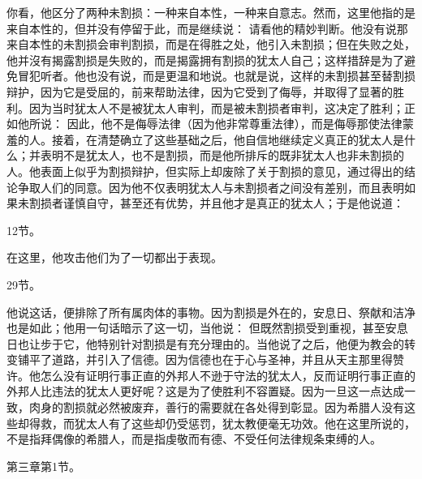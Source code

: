 你看，他区分了两种未割损：一种来自本性，一种来自意志。然而，这里他指的是来自本性的，但并没有停留于此，而是继续说： 请看他的精妙判断。他没有说那来自本性的未割损会审判割损，而是在得胜之处，他引入未割损；但在失败之处，他并沒有揭露割损是失败的，而是揭露拥有割损的犹太人自己；这样措辞是为了避免冒犯听者。他也没有说，而是更温和地说。也就是说，这样的未割损甚至替割损辩护，因为它是受屈的，前来帮助法律，因为它受到了侮辱，并取得了显著的胜利。因为当时犹太人不是被犹太人审判，而是被未割损者审判，这决定了胜利；正如他所说： 因此，他不是侮辱法律（因为他非常尊重法律），而是侮辱那使法律蒙羞的人。接着，在清楚确立了这些基础之后，他自信地继续定义真正的犹太人是什么；并表明不是犹太人，也不是割损，而是他所排斥的既非犹太人也非未割损的人。他表面上似乎为割损辩护，但实际上却废除了关于割损的意见，通过得出的结论争取人们的同意。因为他不仅表明犹太人与未割损者之间没有差别，而且表明如果未割损者谨慎自守，甚至还有优势，并且他才是真正的犹太人；于是他说道：\par

12节。\par

在这里，他攻击他们为了一切都出于表现。\par

29节。\par

他说这话，便排除了所有属肉体的事物。因为割损是外在的，安息日、祭献和洁净也是如此；他用一句话暗示了这一切，当他说： 但既然割损受到重视，甚至安息日也让步于它，他特别针对割损是有充分理由的。当他说了之后，他便为教会的转变铺平了道路，并引入了信德。因为信德也在于心与圣神，并且从天主那里得赞许。他怎么没有证明行事正直的外邦人不逊于守法的犹太人，反而证明行事正直的外邦人比违法的犹太人更好呢？这是为了使胜利不容置疑。因为一旦这一点达成一致，肉身的割损就必然被废弃，善行的需要就在各处得到彰显。因为希腊人没有这些却得救，而犹太人有了这些却仍受惩罚，犹太教便毫无功效。他在这里所说的，不是指拜偶像的希腊人，而是指虔敬而有德、不受任何法律规条束缚的人。\par

第三章第1节。\par

